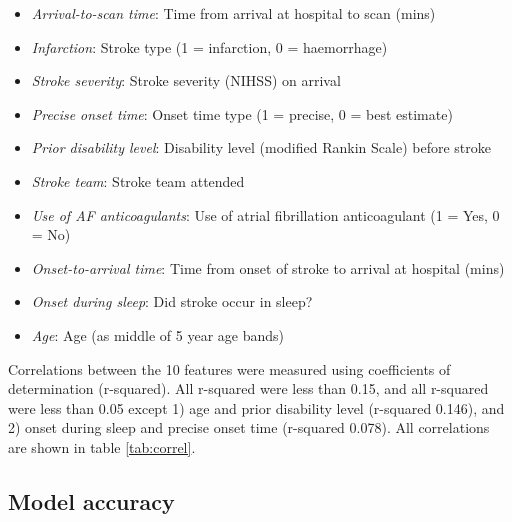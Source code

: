 \begin{itemize}
    \item \emph{Arrival-to-scan time}: Time from arrival at hospital to scan (mins)
    \item \emph{Infarction}: Stroke type (1 = infarction, 0 = haemorrhage)
    \item \emph{Stroke severity}: Stroke severity (NIHSS) on arrival
    \item \emph{Precise onset time}: Onset time type (1 = precise, 0 = best estimate)
    \item \emph{Prior disability level}: Disability level (modified Rankin Scale) before stroke
    \item \emph{Stroke team}: Stroke team attended
    \item \emph{Use of AF anticoagulants}: Use of atrial fibrillation anticoagulant (1 = Yes, 0 = No)
    \item \emph{Onset-to-arrival time}: Time from onset of stroke to arrival at hospital (mins)
    \item \emph{Onset during sleep}: Did stroke occur in sleep?
    \item \emph{Age}: Age (as middle of 5 year age bands)
\end{itemize}

Correlations between the 10 features were measured using coefficients of determination (r-squared). All r-squared were less than 0.15, and all r-squared were less than 0.05 except 1) age and prior disability level (r-squared 0.146), and 2) onset during sleep and precise onset time (r-squared 0.078). All correlations are shown in table \ref{tab:correl}.

\subsection{Model accuracy}



